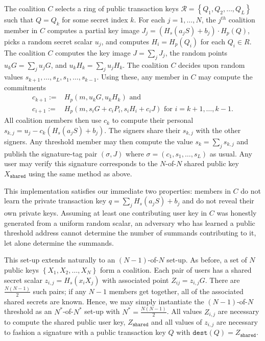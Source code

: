 \documentclass{mrl}
\theoremstyle{definition}
\begin{document}
The coalition $C$ selects a ring of public transaction keys $\mathcal{R} = \left\{Q_1, Q_2, \ldots, Q_L\right\}$ such that $Q = Q_{k}$ for some secret index $k$.  For each $j=1, \ldots, N$, the $j^{th}$ coalition member in $C$ computes a partial key image $J_j = (H_s(a_j S) + b_j)\cdot H_p(Q)$, picks a random secret scalar $u_j$, and computes $H_i = H_{p}(Q_i)$ for each $Q_i \in R$. The coalition $C$ computes the key image $J = \sum_j J_j$, the random points $u_{k} G = \sum_j u_{j} G$, and $u_{k} H_{k}= \sum_j u_{j} H_{k}$. The coalition $C$ decides upon random values $s_{k+1}, \ldots, s_{L}, s_1, \ldots, s_{k-1}$. Using these, any member in $C$ may compute the commitments 
\begin{align*}
c_{k+1} :=& H_{p}(m,  u_k G, u_k H_k) \text{ and}\\
c_{i+1} :=& H_{p}(m,  s_{i} G + c_i P_i, s_{i} H_i + c_i J)\text{ for }i=k+1, \ldots, k-1.
\end{align*}
All coalition members then use $c_k$ to compute their personal $s_{k,j} = u_j - c_{k} (H_s(a_j S) + b_j)$. The signers share their $s_{k,j}$ with the other signers. Any threshold member may then compute the value $s_{k} = \sum_j s_{k,j}$ and publish the signature-tag pair $(\sigma, J)$ where $\sigma = (c_1, s_1, \ldots, s_L)$ as usual. Any user may verify this signature corresponds to the $N$-of-$N$ shared public key $X_{\texttt{shared}}$ using the same method as above.


This implementation satisfies our immediate two properties: members in $C$ do not learn the private transaction key $q=\sum_j H_s(a_j S) + b_j$ and do not reveal their own private keys. Assuming at least one contributing user key in $C$ was honestly generated from a uniform random scalar, an adversary who has learned a public threshold address cannot determine the number of summands contributing to it, let alone determine the summands.  

This set-up extends naturally to an $(N-1)$-of-$N$ set-up. As before, a set of $N$ public keys $\left\{X_{1}, X_{2}, \ldots, X_{N}\right\}$ form a coalition. Each pair of users has a shared secret scalar $z_{i,j} = H_{s}(x_i X_j)$ with associated point $Z_{ij} = z_{i,j}G$. There are $\frac{N(N-1)}{2}$ such pairs; if any $N-1$ members get together, all of the associated shared secrets are known. Hence, we may simply instantiate the $(N-1)$-of-$N$ threshold as an $N^*$-of-$N^*$ set-up with $N^* = \frac{N(N-1)}{2}$. All values $Z_{i,j}$ are necessary to compute the shared public user key, $Z_{\texttt{shared}}$ and all values of $z_{i,j}$ are necessary to fashion a signature with a public transaction key $Q$ with $\texttt{dest}(Q)=Z_{\texttt{shared}}$.
\end{document}
